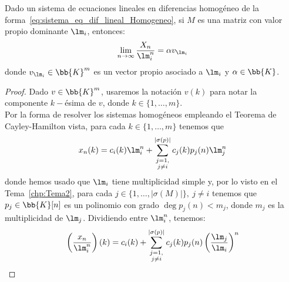 \begin{prop}
    Dado un sistema de ecuaciones lineales en diferencias homogéneo  de la forma~\ref{eq:sistema_eq_dif_lineal_Homogeneo}, si $M$ es una matriz con valor propio dominante $\lm_i$, entonces:
    \begin{equation*}
        \lim_{n\to \infty} \frac{X_n}{\lm_i^n} = \alpha v_{\lm_i}
    \end{equation*}
    donde $v_{\lm_i}\in \bb{K}^m$ es un vector propio asociado a $\lm_i$ y $\alpha\in \bb{K}$.

    \begin{proof}
        Dado $v\in \bb{K}^m$, usaremos la notación $v(k)$ para notar la componente $k-$ésima de $v$, donde $k\in \{1,\dots,m\}$.\\
        
        Por la forma de resolver los sistemas homogéneos empleando el Teorema de Cayley-Hamilton vista,
        para cada $k\in \{1,\dots, m\}$ tenemos que
        \begin{equation*}
            x_n(k) = c_i(k)\lm_i^n + \sum_{\substack{j=1,\\j\neq i}}^{| \sigma(p)|} c_j(k)p_j(n)\lm_j^n
        \end{equation*}
        donde hemos usado que $\lm_i$ tiene multiplicidad simple y, por lo visto en el Tema~\ref{chp:Tema2}, para cada $j\in \{1,\dots,|\sigma(M)|\},~j\neq i$ tenemos que $p_j\in \bb{K}[n]$ es un polinomio con grado $\deg p_j(n)<m_j$, donde $m_j$ es la multiplicidad de $\lm_j$. Dividiendo entre $\lm_i^n$, tenemos:
        \begin{equation*}
            \left(\frac{x_n}{\lm_i^n}\right)(k) = c_i(k) + \sum_{\substack{j=1,\\j\neq i}}^{| \sigma(p)|} c_j(k)p_j(n)\left(\frac{\lm_j}{\lm_i}\right)^n
        \end{equation*}


\end{proof}
\end{prop}
